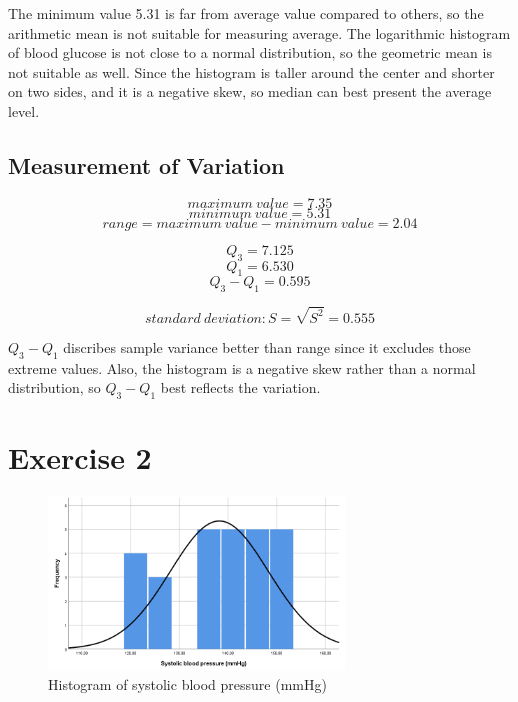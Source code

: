 \documentclass[11pt,a4paper,onside,UTF8]{article}
\begin{document}
The minimum value 5.31 is far from average value compared to others, so the arithmetic mean is not suitable for measuring average.
The logarithmic histogram of blood glucose is not close to a normal distribution, so the geometric mean is not suitable as well.
Since the histogram is taller around the center and shorter on two sides, and it is a negative skew, so median can best present the average level. 

\subsection{Measurement of Variation}

\begin{equation}
	maximum\ value = 7.35
\end{equation}
\begin{equation}
	minimum\ value = 5.31
\end{equation}
\begin{equation}
	range = maximum\ value - minimum\ value = 2.04
\end{equation}

\begin{equation}
	Q_3 = 7.125
\end{equation}
\begin{equation}
	Q_1 = 6.530
\end{equation}
\begin{equation}
	Q_3-Q_1 = 0.595
\end{equation}

\begin{equation}
	standard\ deviation: S = \sqrt{S^2} = 0.555
\end{equation}

$Q_3-Q_1$ discribes sample variance better than range since it excludes those extreme values. 
Also, the histogram is a negative skew rather than a normal distribution, so $Q_3-Q_1$ best reflects the variation.

\section{Exercise 2}
\begin{figure}[H]
	\centering
    \includegraphics[width=0.7\textwidth]{fig//hist2.png}
	\caption{Histogram of systolic blood pressure (mmHg)}
\end{figure}
\end{document}
